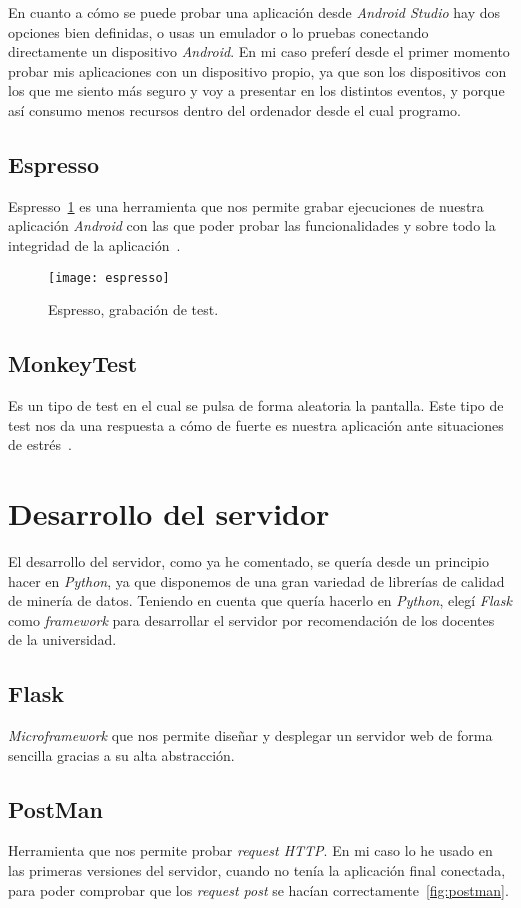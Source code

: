 En cuanto a cómo se puede probar una aplicación desde \textit{Android Studio} hay dos opciones bien definidas, o usas un emulador o lo pruebas conectando directamente un dispositivo \textit{Android}. En mi caso preferí desde el primer momento probar mis aplicaciones con un dispositivo propio, ya que son los dispositivos con los que me siento más seguro y voy a presentar en los distintos eventos, y porque así consumo menos recursos dentro del ordenador desde el cual programo.
\subsection{Espresso}
Espresso~\ref{fig:espresso} es una herramienta que nos permite grabar ejecuciones de nuestra aplicación \textit{Android} con las que poder probar las funcionalidades y sobre todo la integridad de la aplicación~\cite{espresso}.

\begin{figure}
	\centering
	\texttt{[image: espresso]}
	\caption{Espresso, grabación de test.}
	\label{fig:espresso}
\end{figure}
\subsection{MonkeyTest}
Es un tipo de test en el cual se pulsa de forma aleatoria la pantalla. Este tipo de test nos da una respuesta a cómo de fuerte es nuestra aplicación ante situaciones de estrés~\cite{monkeytest}.
\section{Desarrollo del servidor}
El desarrollo del servidor, como ya he comentado, se quería desde un principio hacer en \textit{Python}, ya que disponemos de una gran variedad de librerías de calidad de minería de datos. Teniendo en cuenta que quería hacerlo en \textit{Python}, elegí \textit{Flask} como \textit{framework} para desarrollar el servidor por recomendación de los docentes de la universidad.

\subsection{Flask}
\textit{Microframework} que nos permite diseñar y desplegar un servidor web de forma sencilla gracias a su alta abstracción.

\subsection{PostMan}
Herramienta que nos permite probar \textit{request HTTP}. En mi caso lo he usado en las primeras versiones del servidor, cuando no tenía la aplicación final conectada, para poder comprobar que los \textit{request post} se hacían correctamente~\ref{fig:postman}.

